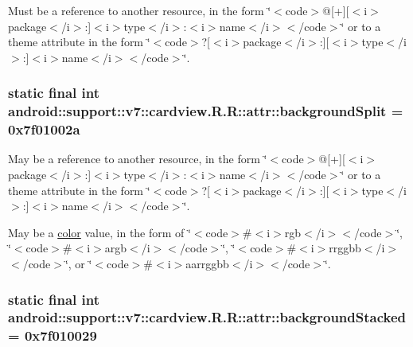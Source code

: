 Must be a reference to another resource, in the form \char`\"{}$<$code$>$@\mbox{[}+\mbox{]}\mbox{[}$<$i$>$package$<$/i$>$:\mbox{]}$<$i$>$type$<$/i$>$:$<$i$>$name$<$/i$>$$<$/code$>$\char`\"{} or to a theme attribute in the form \char`\"{}$<$code$>$?\mbox{[}$<$i$>$package$<$/i$>$:\mbox{]}\mbox{[}$<$i$>$type$<$/i$>$:\mbox{]}$<$i$>$name$<$/i$>$$<$/code$>$\char`\"{}. \hypertarget{classandroid_1_1support_1_1v7_1_1cardview_1_1_r_1_1attr_42f152f8fef1b5ab9b7be4400485604f}{
\subsubsection[{backgroundSplit}]{\setlength{\rightskip}{0pt plus 5cm}static final int android::support::v7::cardview.R.R::attr::backgroundSplit = 0x7f01002a}}
\label{classandroid_1_1support_1_1v7_1_1cardview_1_1_r_1_1attr_42f152f8fef1b5ab9b7be4400485604f}


May be a reference to another resource, in the form \char`\"{}$<$code$>$@\mbox{[}+\mbox{]}\mbox{[}$<$i$>$package$<$/i$>$:\mbox{]}$<$i$>$type$<$/i$>$:$<$i$>$name$<$/i$>$$<$/code$>$\char`\"{} or to a theme attribute in the form \char`\"{}$<$code$>$?\mbox{[}$<$i$>$package$<$/i$>$:\mbox{]}\mbox{[}$<$i$>$type$<$/i$>$:\mbox{]}$<$i$>$name$<$/i$>$$<$/code$>$\char`\"{}. 

May be a \hyperlink{classandroid_1_1support_1_1v7_1_1cardview_1_1_r_1_1color}{color} value, in the form of \char`\"{}$<$code$>$\#$<$i$>$rgb$<$/i$>$$<$/code$>$\char`\"{}, \char`\"{}$<$code$>$\#$<$i$>$argb$<$/i$>$$<$/code$>$\char`\"{}, \char`\"{}$<$code$>$\#$<$i$>$rrggbb$<$/i$>$$<$/code$>$\char`\"{}, or \char`\"{}$<$code$>$\#$<$i$>$aarrggbb$<$/i$>$$<$/code$>$\char`\"{}. \hypertarget{classandroid_1_1support_1_1v7_1_1cardview_1_1_r_1_1attr_8be335dce30eb7305e8e6e1453ca4c90}{
\subsubsection[{backgroundStacked}]{\setlength{\rightskip}{0pt plus 5cm}static final int android::support::v7::cardview.R.R::attr::backgroundStacked = 0x7f010029}}
\label{classandroid_1_1support_1_1v7_1_1cardview_1_1_r_1_1attr_8be335dce30eb7305e8e6e1453ca4c90}


